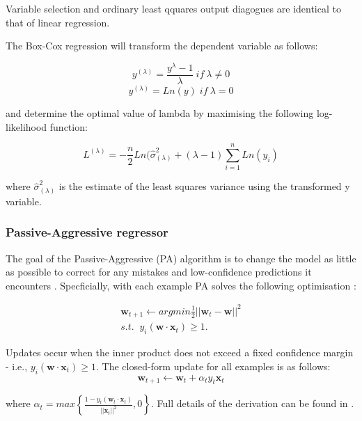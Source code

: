 \documentclass[final,3p,times,twocolumn,numbers]{elsarticle}
\begin{document}
Variable selection and ordinary least qquares output diagogues are identical to that of linear regression. 

The Box-Cox regression will transform the dependent variable as follows:

\begin{equation}
	y^{(\lambda)} = \frac{y^{\lambda}-1}{\lambda}\:if\:\lambda\neq0
\end{equation}
\begin{equation}
	y^{(\lambda)} = Ln(y)\; if\: \lambda=0
\end{equation}

and determine the optimal value of lambda by maximising the following log-likelihood function:

\begin{equation}
	L^{(\lambda)}=-\frac{n}{2}Ln(\hat{\sigma}^2_{(\lambda)}+(\lambda - 1)\sum_{i=1}^nLn(y_i)
\end{equation}

\noindent where $\hat{\sigma}^2_{(\lambda)}$ is the estimate of the least squares variance using the transformed y variable. 

\subsubsection{Passive-Aggressive regressor}

The goal of the Passive-Aggressive (PA) algorithm is to change the model as little as possible to correct for any mistakes and low-confidence predictions it encounters \cite{Gzik2014}. Specficially, with each example PA solves the following optimisation \cite{Ma2009}:

\begin{align}
	\boldsymbol{w}_{t+1}\leftarrow argmin \frac{1}{2}\left|\left|{\boldsymbol{w}_t-\boldsymbol{w}}\right|\right|^2 \\
	s.t. \; \; y_i(\boldsymbol{w}\cdot \boldsymbol{x}_t)\geq1.
\end{align}

\noindent Updates occur when the inner product does not exceed a fixed confidence margin - i.e., $y_i(\boldsymbol{w}\cdot \boldsymbol{x}_t)\geq1$. The closed-form update for all examples is as follows:
\begin{equation}
	\boldsymbol{w}_{t+1}\leftarrow \boldsymbol{w}_{t} + \alpha_t y_t \boldsymbol{x}_t
\end{equation}

\noindent where $\alpha_t=max\left\{\frac{1-y_t(\boldsymbol{w}_t\cdot\boldsymbol{x}_t)}{\left|\left|\boldsymbol{x}_t\right|\right|^2},0\right\}$. Full details of the derivation can be found in \cite{Gzik2014}.
\end{document}
